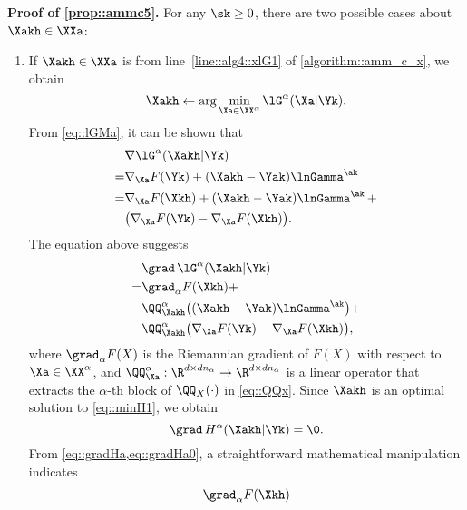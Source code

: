 \vspace{0.8em}
\noindent\textbf{Proof of \ref{prop::ammc5}.\;} For any $\sk\geq 0$,  there are two possible cases about $\Xakh\in\XXa$:
\begin{enumerate}[leftmargin=0.45cm]%
\item If $\Xakh\in\XXa$ is from line~\ref{line::alg4::xlG1} of \cref{algorithm::amm_c_x}, we obtain
\begin{equation}\label{eq::minH1}
	\Xakh\gets\arg\min\limits_{\Xa\in\XX^\alpha }\lG^\alpha(\Xa|\Yk).
\end{equation}
From \cref{eq::lGMa}, it can be shown that
\begin{equation}
	\nonumber
	\begin{aligned}
		&\nabla \lG^\alpha(\Xakh|\Yk)\\
		=&\nabla_{\Xa} F(\Yk)+(\Xakh-\Yak)\lnGamma^{\ak}\\
		=&\nabla_{\Xa} F(\Xkh)+(\Xakh-\Yak)\lnGamma^{\ak}\, +\\
		&\big(\nabla_{\Xa} F(\Yk) -\nabla_{\Xa} F(\Xkh)\big).
	\end{aligned}
\end{equation}
The equation above suggests
\begin{equation}\label{eq::gradHa}
\begin{aligned}
&\grad\, \lG^\alpha(\Xakh|\Yk)\\
=&\grad_{\alpha} F(\Xkh)+\\
&\QQ_{\Xakh}^\alpha\big((\Xakh-\Yak)\lnGamma^{\ak}\big) +\\
&\QQ_{\Xakh}^\alpha\big(\nabla_{\Xa} F(\Yk) -\nabla_{\Xa} F(\Xkh)\big),
\end{aligned}
\end{equation}
where $\grad_\alpha F(X)$ is the Riemannian gradient of $F(X)$ with respect to $\Xa \in\XX^\alpha$, and $\QQ_{\Xa}^\alpha: \R^{d\times dn_\alpha}\rightarrow \R^{d\times dn_\alpha}$ is a linear operator that extracts the $\alpha$-th block of $\QQ_{X}(\cdot)$ in \cref{eq::QQx}. Since $\Xakh$ is an optimal solution to \cref{eq::minH1}, we obtain
\begin{equation}\label{eq::gradHa0}
\grad\, H^\alpha(\Xakh|\Yk)=\0.
\end{equation}
From \cref{eq::gradHa,eq::gradHa0}, a straightforward mathematical manipulation indicates
\begin{equation}\label{eq::gradnFh1}
	\begin{aligned}
		&\grad_{\alpha} F(\Xkh) \\

\end{aligned}
\end{equation}
\end{enumerate}
